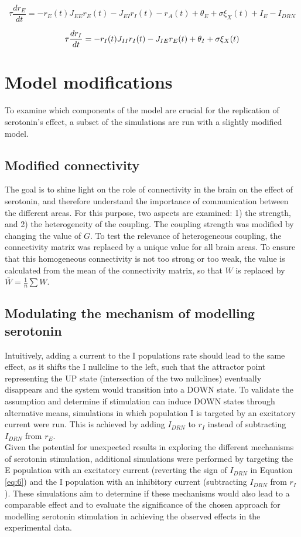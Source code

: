 \begin{equation}\label{eq:6}
\tau \frac{dr_E}{dt} = - r_E(t) J_{EE} r_E(t) - J_{EI} r_I(t) - r_A(t) + \theta_E + \sigma \xi_X(t) + I_E - I_{DRN}
\end{equation}

\begin{equation}\label{eq:7}
        \tau \frac{dr_I}{dt} = -r_I(t) J_{II} r_I(t) - J_{IE} r_E(t) + \theta_I + \sigma \xi_X(t) \\[20pt]
\end{equation}

\section{Model modifications}
\noindent
\indent To examine which components of the model are crucial for the replication of serotonin's effect, a subset of the simulations are run with a slightly modified model. 
\subsection{Modified connectivity}
\noindent
\indent The goal is to shine light on the role of connectivity in the brain on the effect of serotonin, and therefore understand the importance of communication between the different areas. For this purpose, two aspects are examined: 1) the strength, and 2) the heterogeneity of the coupling. The coupling strength was modified by changing the value of $G$. To test the relevance of heterogeneous coupling, the connectivity matrix was replaced by a unique value for all brain areas. To ensure that this homogeneous connectivity is not too strong or too weak, the value is calculated from the mean of the connectivity matrix, so that $W$ is replaced by \(\bar{W} = \frac{1}{n} \sum W\).

\subsection{Modulating the mechanism of modelling serotonin}
\noindent
\indent Intuitively, adding a current to the I populations rate should lead to the same effect, as it shifts the I nullcline to the left, such that the attractor point representing the UP state (intersection of the two nullclines) eventually disappears and the system would transition into a DOWN state. 
To validate the assumption and determine if stimulation can induce DOWN states through alternative means, simulations in which population I is targeted by an excitatory current were run. This is achieved by adding 
$I_{DRN}$ to $r_I$ instead of subtracting $I_{DRN}$ from $r_E$.
\\
\indent Given the potential for unexpected results in exploring the different mechanisms of serotonin stimulation, additional simulations were performed by targeting the E population with an excitatory current (reverting the sign of $I_{DRN}$ in Equation \ref{eq:6}) and the I population with an inhibitory current (subtracting $I_{DRN}$ from $r_I$). These simulations aim to determine if these mechanisms would also lead to a comparable effect and to evaluate the significance of the chosen approach for modelling serotonin stimulation in achieving the observed effects in the experimental data.

